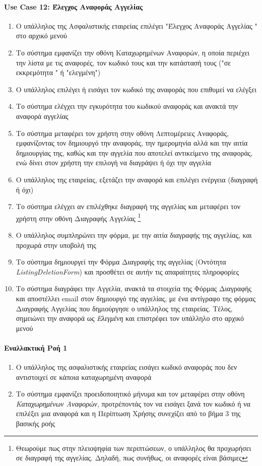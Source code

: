 \documentclass{../ol-softwaremanual}
\begin{document}
	\paragraph{\en Use Case 12: \gr Έλεγχος Αναφοράς Αγγελίας}
	\begin{enumerate}
		\item Ο υπάλληλος της Ασφαλιστικής εταιρείας επιλέγει \en"\gr Έλεγχος Αναφοράς Αγγελίας \en" \gr στο αρχικό μενού
		\item Το σύστημα εμφανίζει την οθόνη Καταχωρημένων Αναφορών, η οποία περιέχει την λίστα με τις αναφορές, τον κωδικό τους και την κατάστασή τους (\en"\gr σε εκκρεμότητα \en" \gr ή \en"\gr ελεγμένη\en"\gr)
		\item Ο υπάλληλος επιλέγει ή εισάγει τον κωδικό της αναφοράς που επιθυμεί να ελέγξει 
		\item Το σύστημα ελέγχει την εγκυρότητα του κωδικού αναφοράς και ανακτά την αναφορά αγγελίας
		\item Το σύστημα μεταφέρει τον χρήστη στην οθόνη Λεπτομέρειες Αναφοράς, εμφανίζοντας τον δημιουργό την αναφοράς, την ημερομηνία αλλά και την αιτία δημιουργίας της, καθώς και την αγγελία που αποτελεί αντικείμενο της αναφοράς, ενώ δίνει στον χρήστη την επιλογή να διαγράψει ή όχι την αγγελία
		\item Ο υπάλληλος της εταιρείας, εξετάζει την αναφορά και επιλέγει ενέργεια (διαγραφή ή όχι)
		\item Το σύστημα ελέγχει αν επιλέχθηκε διαγραφή της αγγελίας και μεταφέρει τον χρήστη στην οθόνη Διαγραφής Αγγελίας \footnote[2]{Θεωρούμε πως στην πλειοψηφία των περιπτώσεων, ο υπάλληλος θα προχωρήσει σε διαγραφή της αγγελίας. Δηλαδή, πως συνήθως, οι αναφορές είναι βάσιμες}
		\item Ο υπάλληλος συμπληρώνει την φόρμα, με την αιτία διαγραφής της αγγελίας, και προχωρά στην υποβολή της
		\item Το σύστημα δημιουργεί την Φόρμα Διαγραφής της αγγελίας (Οντότητα \en \textit{ListingDeletionForm}\gr) και προσθέτει σε αυτήν τις απαραίτητες πληροφορίες		
		\item Το σύστημα διαγράφει την Αγγελία, ανακτά τα στοιχεία της Φόρμας Διαγραφής και αποστέλλει \en email \gr στον δημιουργό της αγγελίας, με ένα αντίγραφο της φόρμας Διαγραφής Αγγελίας που δημιούργησε ο υπάλληλος της εταιρείας. Τέλος, σημειώνει την αναφορά ως \textit{Ελεγμένη} και επιστρέφει τον υπάλληλο στο αρχικό μενού
	\end{enumerate}
	
	\paragraph{Εναλλακτική Ροή 1}
	\begin{enumerate}
		\item Ο υπάλληλος της ασφαλιστικής εταιρείας εισάγει κωδικό αναφοράς που δεν αντιστοιχεί σε κάποια καταχωρημένη αναφορά
		\item Το σύστημα εμφανίζει προειδοποιητικό μήνυμα και τον μεταφέρει στην οθόνη \textit{Καταχωρημένων Αναφορών}, προτρέποντάς τον να εισάγει ξανά τον κωδικό ή να επιλέξει μια αναφορά και η Περίπτωση Χρήσης συνεχίζει από το βήμα 3 της βασικής ροής
	\end{enumerate}	
	
\end{document}
